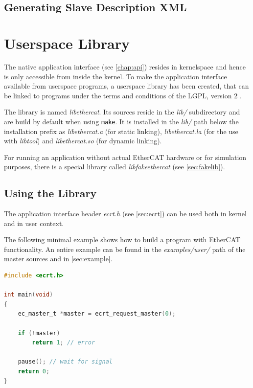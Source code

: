 \documentclass[a4paper,12pt,BCOR=6mm,bibtotoc,idxtotoc]{scrbook}
\begin{document}
\subsection{Generating Slave Description XML}




\section{Userspace Library}
\label{sec:userlib}

The native application interface (see \autoref{chap:api}) resides in
kernelspace and hence is only accessible from inside the kernel. To make the
application interface available from userspace programs, a userspace library
has been created, that can be linked to programs under the terms and
conditions of the LGPL, version 2 \cite{lgpl}.

The library is named \textit{libethercat}. Its sources reside in the
\textit{lib/} subdirectory and are build by default when using
\lstinline+make+. It is installed in the \textit{lib/} path below the
installation prefix as \textit{libethercat.a} (for static linking),
\textit{libethercat.la} (for the use with \textit{libtool}) and
\textit{libethercat.so} (for dynamic linking).

For running an application without actual EtherCAT hardware or for simulation
purposes, there is a special library called \textit{libfakeethercat} (see
\autoref{sec:fakelib}).

\subsection{Using the Library}

The application interface header \textit{ecrt.h} (see \autoref{sec:ecrt}) can
be used both in kernel and in user context.

The following minimal example shows how to build a program with EtherCAT
functionality. An entire example can be found in the \textit{examples/user/}
path of the master sources and in \autoref{sec:example}.

\begin{lstlisting}[language=C]
#include <ecrt.h>

int main(void)
{
    ec_master_t *master = ecrt_request_master(0);

    if (!master)
        return 1; // error

    pause(); // wait for signal
    return 0;
}
\end{lstlisting}
\end{document}

